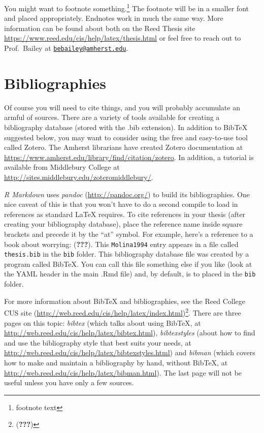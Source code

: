 \documentclass[12pt, twoside]{amherstthesis}
\begin{document}
You might want to footnote something.\footnote{footnote text} The footnote will be in a smaller font and placed appropriately. Endnotes work in much the same way. More information can be found about both on the Reed Thesis site \url{https://www.reed.edu/cis/help/latex/thesis.html} or feel free to reach out to Prof.~Bailey at \href{mailto:bebailey@amherst.edu}{\nolinkurl{bebailey@amherst.edu}}.

\hypertarget{bibliographies}{%
\section{Bibliographies}\label{bibliographies}}

Of course you will need to cite things, and you will probably accumulate an armful of sources. There are a variety of tools available for creating a bibliography database (stored with the .bib extension). In addition to BibTeX suggested below, you may want to consider using the free and easy-to-use tool called Zotero. The Amherst librarians have created Zotero documentation at \url{https://www.amherst.edu/library/find/citation/zotero}. In addition, a tutorial is available from Middlebury College at \url{http://sites.middlebury.edu/zoteromiddlebury/}.

\emph{R Markdown} uses \emph{pandoc} (\url{http://pandoc.org/}) to build its bibliographies. One nice caveat of this is that you won't have to do a second compile to load in references as standard LaTeX requires. To cite references in your thesis (after creating your bibliography database), place the reference name inside square brackets and precede it by the ``at'' symbol. For example, here's a reference to a book about worrying: ({\textbf{???}}). This \texttt{Molina1994} entry appears in a file called \texttt{thesis.bib} in the \texttt{bib} folder. This bibliography database file was created by a program called BibTeX. You can call this file something else if you like (look at the YAML header in the main .Rmd file) and, by default, is to placed in the \texttt{bib} folder.

For more information about BibTeX and bibliographies, see the Reed College CUS site (\url{http://web.reed.edu/cis/help/latex/index.html})\footnote{({\textbf{???}})}. There are three pages on this topic: \emph{bibtex} (which talks about using BibTeX, at \url{http://web.reed.edu/cis/help/latex/bibtex.html}), \emph{bibtexstyles} (about how to find and use the bibliography style that best suits your needs, at \url{http://web.reed.edu/cis/help/latex/bibtexstyles.html}) and \emph{bibman} (which covers how to make and maintain a bibliography by hand, without BibTeX, at \url{http://web.reed.edu/cis/help/latex/bibman.html}). The last page will not be useful unless you have only a few sources.
\end{document}
